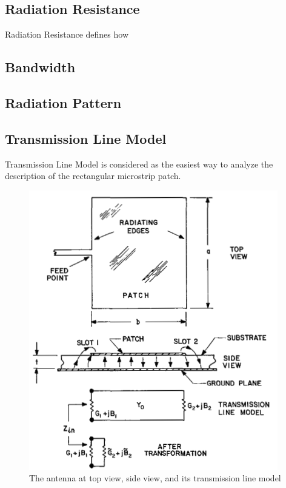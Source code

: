 \documentclass[11pt,a4paper]{article}
\begin{document}
    \subsection{Radiation Resistance}
      \indent Radiation Resistance defines how 
        \begin{equation}
        \end{equation}
    \subsection{Bandwidth}

    \subsection{Radiation Pattern}
    
  \newpage

    \subsection{Transmission Line Model}
      \indent Transmission Line Model is considered as the easiest way to analyze the description of the
              rectangular microstrip patch.
      \begin{figure}[ht]
        \includegraphics{tmmodel.png}
          \centering
          \caption{The antenna at top view, side view, and its transmission line model\cite{CaM:81}}
      \end{figure}
\end{document}
